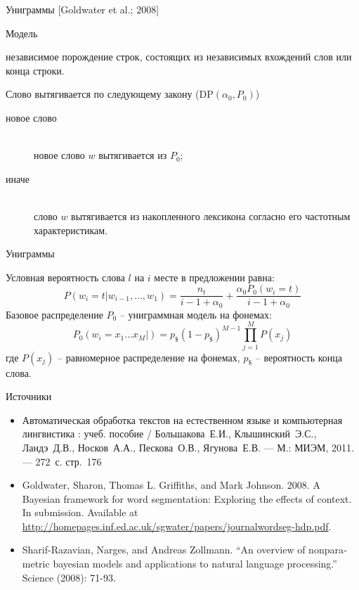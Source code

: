 \documentclass{beamer}
\newcommand{\eng}[1]{\foreignlanguage{english}{#1}}
\newcommand{\brac}[1]{\left ( #1 \right )}
\newcommand{\induc}[1]{\left . #1 \right \vert}
\begin{document}
\begin{frame}{Униграммы [\eng{Goldwater et al.; 2008}]}
  \begin{block}{Модель}

    независимое порождение строк, состоящих из независимых вхождений слов или конца строки. 
  \end{block}

  \begin{block}

    Слово вытягивается по следующему закону ($\text{DP}\brac{\alpha_0,P_0}$)
    \begin{description}
      \item[новое слово]\hfill\\
        новое слово $w$ вытягивается из $P_0$;
        \item[иначе]\hfill\\
        слово $w$ вытягивается из накопленного лексикона согласно его частотным характеристикам.
    \end{description}    
  \end{block}
\end{frame}
\begin{frame}{Униграммы}
  \begin{block}

    Условная вероятность слова $l$ на $i$ месте в предложении равна:
    \[P\brac{\induc{w_i = t}w_{i-1},\ldots,w_1} = \frac{n_t}{i-1+\alpha_0} + \frac{\alpha_0 P_0(w_i = t)}{i-1+\alpha_0}\]
    Базовое распределение $P_0$ -- униграммная модель на фонемах:
    \[P_0\brac{\induc{w_i = x_1\ldots x_M}} = p_\$ \brac{1-p_\$}^{M-1} \prod_{j=1}^M P(x_j)\]
    где $P(x_j)$ -- равномерное распределение на фонемах, $p_\$$ -- вероятность конца слова.
  \end{block}
\end{frame}

\begin{frame}{Источники}
  \begin{block}

    \begin{itemize}
      \item Автоматическая обработка текстов на естественном языке и компьютерная лингвистика : учеб. пособие / Большакова~Е.И., Клышинский~Э.С., Ландэ~Д.В., Носков~А.А., Пескова~О.В., Ягунова~Е.В. — М.: МИЭМ, 2011. — 272~с. стр.~176
      \item \eng{Goldwater, Sharon, Thomas L. Griffiths, and Mark Johnson. 2008. A Bayesian framework for word segmentation: Exploring the effects of context. In submission. Available at \url{http://homepages.inf.ed.ac.uk/sgwater/papers/journalwordseg-hdp.pdf}.}
      \item \eng{Sharif-Razavian, Narges, and Andreas Zollmann. ``An overview of nonparametric bayesian models and applications to natural language processing.'' Science (2008): 71-93.}
    \end{itemize}
  \end{block}
\end{frame}
\end{document}
